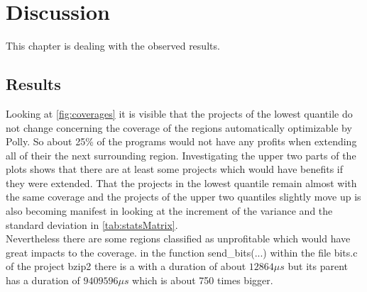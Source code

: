 \chapter{Discussion}
This chapter is dealing with the observed results.

\section{Results}
Looking at \autoref{fig:coverages} it is visible that the projects of the lowest quantile do not change concerning the coverage of the regions automatically optimizable by Polly.
So about 25\% of the programs would not have any profits when extending all of their \scops the next surrounding region.
Investigating the upper two parts of the plots shows that there are at least some projects which would have benefits if they were extended.
That the projects in the lowest quantile remain almost with the same coverage and the projects of the upper two quantiles slightly move up is also becoming manifest in looking at the increment of the variance and the standard deviation in \autoref{tab:statsMatrix}.\\
Nevertheless there are some regions classified as unprofitable which would have great impacts to the coverage.
\Eg in the function send\_bits(...) within the file bits.c of the project bzip2 there is a \scop with a duration of about \(12864 \mu s\) but its parent has a duration of \(9409596 \mu s\) which is about 750 times bigger.

